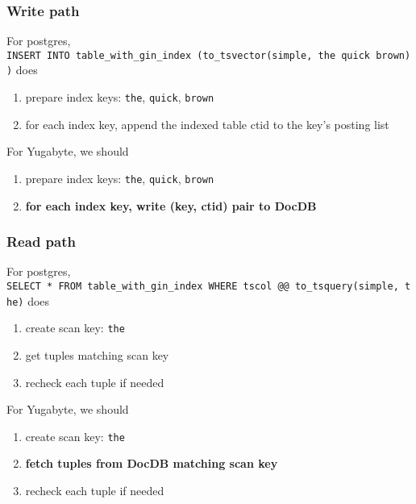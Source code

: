 \documentclass[11pt]{article}
\providecommand{\tightlist}{%
  \setlength{\itemsep}{0pt}\setlength{\parskip}{0pt}}
\begin{document}
\hypertarget{write-path}{%
\subsubsection{Write path}\label{write-path}}

For postgres,
\texttt{INSERT\ INTO\ table\_with\_gin\_index\ (to\_tsvector(\textquotesingle{}simple\textquotesingle{},\ \textquotesingle{}the\ quick\ brown\textquotesingle{}))}
does

\begin{enumerate}
\def\labelenumi{\arabic{enumi}.}
\tightlist
\item
  prepare index keys: \texttt{the}, \texttt{quick}, \texttt{brown}
\item
  for each index key, append the indexed table ctid to the key's posting
  list
\end{enumerate}

For Yugabyte, we should

\begin{enumerate}
\def\labelenumi{\arabic{enumi}.}
\tightlist
\item
  prepare index keys: \texttt{the}, \texttt{quick}, \texttt{brown}
\item
  \textbf{for each index key, write (key, ctid) pair to DocDB}
\end{enumerate}

\hypertarget{read-path}{%
\subsubsection{Read path}\label{read-path}}

For postgres,
\texttt{SELECT\ *\ FROM\ table\_with\_gin\_index\ WHERE\ tscol\ @@\ to\_tsquery(\textquotesingle{}simple\textquotesingle{},\ \textquotesingle{}the\textquotesingle{})}
does

\begin{enumerate}
\def\labelenumi{\arabic{enumi}.}
\tightlist
\item
  create scan key: \texttt{the}
\item
  get tuples matching scan key
\item
  recheck each tuple if needed
\end{enumerate}

For Yugabyte, we should

\begin{enumerate}
\def\labelenumi{\arabic{enumi}.}
\tightlist
\item
  create scan key: \texttt{the}
\item
  \textbf{fetch tuples from DocDB matching scan key}
\item
  recheck each tuple if needed
\end{enumerate}
\end{document}
